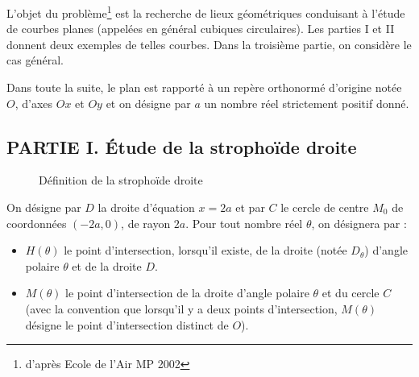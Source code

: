 L'objet du probl{\`e}me\footnote{d'après Ecole de l'Air MP 2002} est
la recherche de lieux g{\'e}om{\'e}triques conduisant {\`a}
l'{\'e}tude de courbes planes (appel{\'e}es en g{\'e}n{\'e}ral
cubiques circulaires). Les parties I et II donnent deux exemples de
telles courbes. Dans la troisi{\`e}me partie, on consid{\`e}re le
cas g{\'e}n{\'e}ral.

Dans toute la suite, le plan est rapport{\'e} {\`a} un rep{\`e}re
orthonorm{\'e} d'origine not{\'e}e $O$, d'axes $Ox$ et $Oy$ et on
d{\'e}signe par $a$ un nombre r{\'e}el strictement positif
donn{\'e}.

\subsection*{PARTIE I. \'Etude de la stropho{\"i}de droite}
\begin{figure}[ht]
 \centering
  
\caption{Définition de la strophoïde droite}
\end{figure}

On d{\'e}signe par $D$ la droite d'{\'e}quation $x = 2a$ et par $C$
le cercle de centre $M_{0}$ de coordonnées $(-2a, 0)$, de rayon $2a$.\newline
Pour tout nombre r{\'e}el $\theta$, on d{\'e}signera par :
\begin{itemize}
\item $H(\theta)$ le point d'intersection, lorsqu'il existe, de la droite (notée $D_\theta$) d'angle polaire $\theta$ et de la droite $D$.
\item $M(\theta)$ le point d'intersection de la droite d'angle polaire $\theta$ et du cercle $C$ (avec la convention que lorsqu'il y a deux points d'intersection, $M(\theta)$ d{\'e}signe le point d'intersection distinct de $O$).
\end{itemize}


